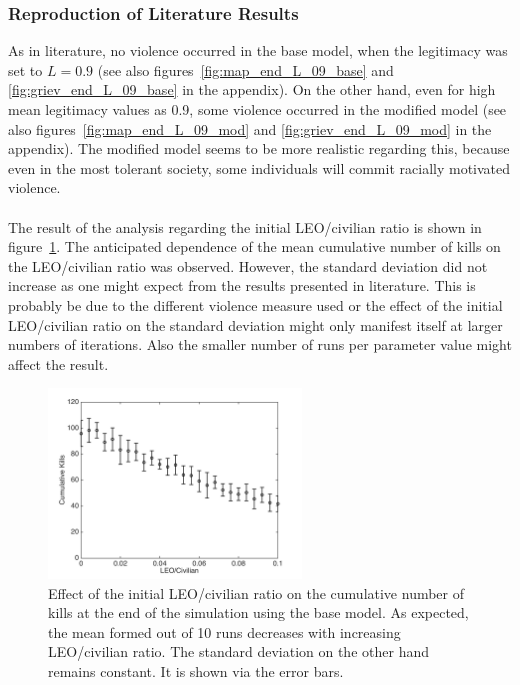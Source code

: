 \documentclass[11pt]{article}
\begin{document}
\subsubsection{Reproduction of Literature Results \cite{Epstein2002}}
As in literature, no violence occurred in the base model, when the legitimacy was set to $L=0.9$ (see also figures~\ref{fig:map_end_L_09_base} and  \ref{fig:griev_end_L_09_base} in the appendix). On the other hand, even for high mean legitimacy values as 0.9, some violence occurred in the modified model (see also figures~\ref{fig:map_end_L_09_mod} and \ref{fig:griev_end_L_09_mod} in the appendix). The modified model seems to be more realistic regarding this, because even in the most tolerant society, some individuals will commit racially motivated violence.\\
\\
The result of the analysis regarding the initial LEO/civilian ratio is shown in figure~\ref{fig:LEO_civ_base}. The anticipated dependence of the mean cumulative number of kills on the LEO/civilian ratio was observed. However, the standard deviation did not increase as one might expect from the results presented in literature. This is probably be due to the different violence measure used or the effect of the initial LEO/civilian ratio on the standard deviation might only manifest itself at larger numbers of iterations. Also the smaller number of runs per parameter value might affect the result.
\begin{figure}[!htbp]
	\centering
		\includegraphics[width=0.6\textwidth]{../../code/base_model/cum_kills_vs_LEO_civ.png}
	\caption{Effect of the initial LEO/civilian ratio on the cumulative number of kills at the end of the simulation using the base model. As expected, the mean formed out of 10 runs decreases with increasing LEO/civilian ratio. The standard deviation on the other hand remains constant. It is shown via the error bars.}
	\label{fig:LEO_civ_base}
\end{figure}
\end{document}
